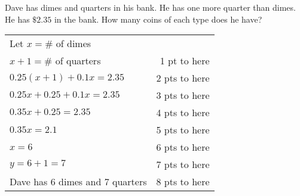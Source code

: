 {
	Dave has dimes and quarters in his bank. He has one more quarter than dimes. He has $\$2.35$ in the bank. How many coins of each type does he have?
}
{
	\begin{tabular}{l r}
	Let $x=\#$ of dimes & \\
	$x+1=\#$ of quarters & 1 pt to here\\
	$0.25(x+1)+0.1x=2.35$ & 2 pts to here\\
	$0.25x+0.25+0.1x=2.35$ & 3 pts to here\\
	$0.35x+0.25 =2.35$ & 4 pts to here\\
	$0.35x=2.1$ & 5 pts to here\\
	$x=6$ & 6 pts to here\\
	$y=6+1=7$ & 7 pts to here\\
	Dave has $6$ dimes and $7$ quarters & 8 pts to here
	\end{tabular}
}
